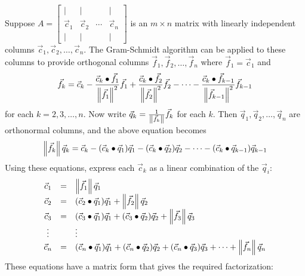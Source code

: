\documentclass{ximera}
\begin{document}
    
Suppose $A = \left[ \begin{array}{cccc}
|&|& &| \\
\vec{c}_{1} & \vec{c}_{2} & \cdots &  \vec{c}_{n}\\
|&|& &|
\end{array}\right]$ is an $m \times n$ matrix with linearly independent columns $\vec{c}_{1}, \vec{c}_{2}, \dots, \vec{c}_{n}$. The Gram-Schmidt algorithm can be applied to these columns to provide orthogonal columns $\vec{f}_{1}, \vec{f}_{2}, \dots, \vec{f}_{n}$ where $\vec{f}_{1} = \vec{c}_{1}$ and
\begin{equation*}
\vec{f}_{k} = \vec{c}_{k} - \frac{\vec{c}_{k} \bullet \vec{f}_{1}}{\left\| \vec{f}_{1} \right\|^2}\vec{f}_{1} + \frac{\vec{c}_{k} \bullet \vec{f}_{2}}{\left\| \vec{f}_{2} \right\|^2}\vec{f}_{2} - \dots - \frac{\vec{c}_{k} \bullet \vec{f}_{k-1}}{\left\| \vec{f}_{k-1} \right\|^2}\vec{f}_{k-1}
\end{equation*}
for each $k = 2, 3, \dots, n$. Now write $\vec{q}_{k} = \frac{1}{\left\| \vec{f}_{k} \right\|}\vec{f}_{k}$ for each $k$. Then $\vec{q}_{1}, \vec{q}_{2}, \dots, \vec{q}_{n}$ are orthonormal columns, and the above equation becomes
\begin{equation*}
\left\| \vec{f}_{k} \right\| \vec{q}_{k} = \vec{c}_{k} - (\vec{c}_{k} \bullet \vec{q}_{1})\vec{q}_{1} - (\vec{c}_{k} \bullet \vec{q}_{2})\vec{q}_{2} - \dots - (\vec{c}_{k} \bullet \vec{q}_{k-1})\vec{q}_{k-1}
\end{equation*}
Using these equations, express each $\vec{c}_{k}$ as a linear combination of the $\vec{q}_{i}$:
\begin{equation*}
\begin{array}{ccl}
\vec{c}_{1} &=& \left\| \vec{f}_{1} \right\| \vec{q}_{1} \\
\vec{c}_{2} &=& (\vec{c}_{2} \bullet \vec{q}_{1})\vec{q}_{1} + \left\| \vec{f}_{2} \right\| \vec{q}_{2} \\
\vec{c}_{3} &=& (\vec{c}_{3} \bullet \vec{q}_{1})\vec{q}_{1} + (\vec{c}_{3} \bullet \vec{q}_{2})\vec{q}_{2} + \left\| \vec{f}_{3} \right\| \vec{q}_{3} \\
\vdots && \vdots \\
\vec{c}_{n} &=& (\vec{c}_{n} \bullet \vec{q}_{1})\vec{q}_{1} + (\vec{c}_{n} \bullet \vec{q}_{2})\vec{q}_{2} + (\vec{c}_{n} \bullet \vec{q}_{3})\vec{q}_{3} + \dots + \left\| \vec{f}_{n} \right\| \vec{q}_{n}
\end{array}
\end{equation*}
These equations have a matrix form that gives the required factorization:
\end{document}
